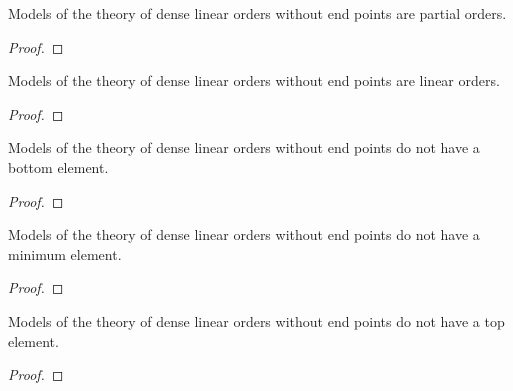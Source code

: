 \begin{lemma}
    \label{lem:partial-order-dlo}
    \leanok
    Models of the theory of dense linear orders without end points are partial orders.
\end{lemma}
\begin{proof}
    \leanok
\end{proof}

\begin{lemma}
    \label{lem:linearorder-dlo}
    \leanok
    Models of the theory of dense linear orders without end points are linear orders.
\end{lemma}
\begin{proof}
    \leanok
\end{proof}

\begin{lemma}
    \label{lem:no-bot-order-dlo}
    \leanok
    Models of the theory of dense linear orders without end points do not have a bottom element.
\end{lemma}
\begin{proof}
    \leanok
\end{proof}

\begin{lemma}
    \label{lem:no-min-order-dlo}
    \leanok
    Models of the theory of dense linear orders without end points do not have a minimum element.
\end{lemma}
\begin{proof}
    \leanok
\end{proof}

\begin{lemma}
    \label{lem:no-top-order-dlo}
    \leanok
    Models of the theory of dense linear orders without end points do not have a top element.
\end{lemma}
\begin{proof}
    \leanok
\end{proof}

